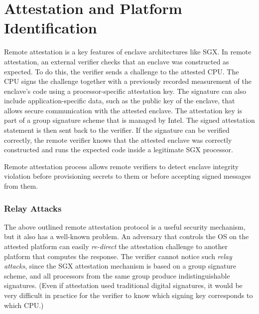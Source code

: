 
\section*{Attestation and Platform Identification}

Remote attestation is a key features of enclave architectures like SGX. In remote attestation, an external verifier checks that an enclave was constructed as expected. To do this, the verifier sends a challenge to the attested CPU. The CPU signs the challenge together with a previously recorded measurement of the enclave's code using a processor-specific attestation key. The signature can also include application-specific data, such as the public key of the enclave, that allows secure communication with the attested enclave. The attestation key is part of a group signature scheme that is managed by Intel. The signed attestation statement is then sent back to the verifier. If the signature can be verified correctly, the remote verifier knows that the attested enclave was correctly constructed and runs the expected code inside a legitimate SGX processor. 

Remote attestation process allows remote verifiers to detect enclave integrity violation before provisioning secrets to them or before accepting signed messages from them.  

\subsubsection*{Relay Attacks}

The above outlined remote attestation protocol is a useful security mechanism, but it also has a well-known problem. 
An adversary that controls the OS on the attested platform can easily \emph{re-direct} the attestation challenge to another platform that computes the response. 
The verifier cannot notice such \emph{relay attacks}, since the SGX attestation mechanism is based on a group signature scheme, and all processors from the same group produce indistinguishable signatures. (Even if attestation used traditional digital signatures, it would be very difficult in practice for the verifier to know which signing key corresponds to which CPU.) 


